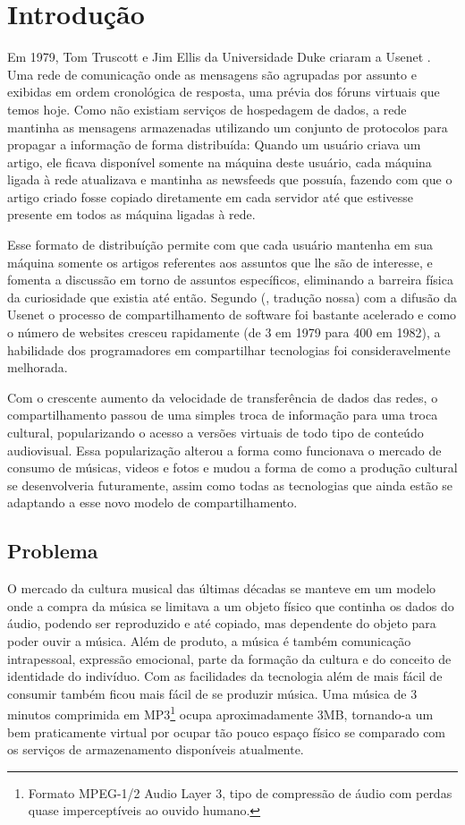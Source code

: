 \chapter{Introdução}
\label{c.introducao}

Em 1979, Tom Truscott e Jim Ellis da Universidade Duke criaram a Usenet \cite{unite10}. Uma rede de comunicação onde as mensagens são agrupadas por assunto e exibidas em ordem cronológica de resposta, uma prévia dos fóruns virtuais que temos hoje. 
Como não existiam serviços de hospedagem de dados, a rede mantinha as mensagens armazenadas utilizando um conjunto de protocolos para propagar a informação de forma distribuída: Quando um usuário criava um artigo, ele ficava disponível somente na máquina deste usuário, cada máquina ligada à rede atualizava e mantinha as newsfeeds que possuía, fazendo com que o artigo criado fosse copiado diretamente em cada servidor até que estivesse presente em todos as máquina ligadas à rede.

Esse formato de distribuíção permite com que cada usuário mantenha em sua máquina somente os artigos referentes aos assuntos que lhe são de interesse, e fomenta a discussão em torno de assuntos específicos, eliminando a barreira física da curiosidade que existia até então. Segundo  (\citeyear{NBERw7600}, tradução nossa) com a difusão da Usenet o processo de compartilhamento de software foi bastante acelerado e como o número de websites cresceu rapidamente (de 3 em 1979 para 400 em 1982), a habilidade dos programadores em compartilhar tecnologias foi consideravelmente melhorada.

Com o crescente aumento da velocidade de transferência de dados das redes, o compartilhamento passou de uma simples troca de informação para uma troca cultural, popularizando o acesso a versões virtuais de todo tipo de conteúdo audiovisual. Essa popularização alterou a forma como funcionava o mercado de consumo de músicas, videos e fotos e mudou a forma de como a produção cultural se desenvolveria futuramente, assim como todas as tecnologias que ainda estão se adaptando a esse novo modelo de compartilhamento.

\section{Problema}
\label{s.problema}

O mercado da cultura musical das últimas décadas se manteve em um modelo onde a compra da música se limitava a um objeto físico que continha os dados do áudio, podendo ser reproduzido e até copiado, mas dependente do objeto para poder ouvir a música. Além de produto, a música é também comunicação intrapessoal, expressão emocional, parte da formação da cultura e do conceito de identidade do indivíduo. Com as facilidades da tecnologia além de mais fácil de consumir também ficou mais fácil de se produzir música. Uma música de 3 minutos comprimida em MP3\footnote{Formato MPEG-1/2 Audio Layer 3, tipo de compressão de áudio com perdas quase imperceptíveis ao ouvido humano.} ocupa aproximadamente 3MB, tornando-a um bem praticamente virtual por ocupar tão pouco espaço físico se comparado com os serviços de armazenamento disponíveis atualmente.

